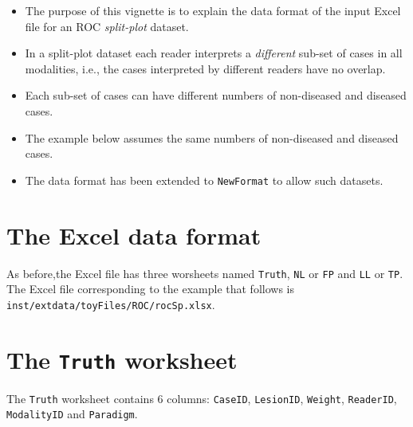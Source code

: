 \documentclass[]{book}
\providecommand{\tightlist}{%
  \setlength{\itemsep}{0pt}\setlength{\parskip}{0pt}}
\begin{document}
\begin{itemize}
\tightlist
\item
  The purpose of this vignette is to explain the data format of the input Excel file for an ROC \emph{split-plot} dataset.
\item
  In a split-plot dataset each reader interprets a \emph{different} sub-set of cases in all modalities, i.e., the cases interpreted by different readers have no overlap.
\item
  Each sub-set of cases can have different numbers of non-diseased and diseased cases.
\item
  The example below assumes the same numbers of non-diseased and diseased cases.
\item
  The data format has been extended to \texttt{NewFormat} to allow such datasets.
\end{itemize}

\hypertarget{the-excel-data-format-2}{%
\section{The Excel data format}\label{the-excel-data-format-2}}

As before,the Excel file has three worsheets named \texttt{Truth}, \texttt{NL} or \texttt{FP} and \texttt{LL} or \texttt{TP}. The Excel file corresponding to the example that follows is \texttt{inst/extdata/toyFiles/ROC/rocSp.xlsx}.

\hypertarget{the-truth-worksheet-2}{%
\section{\texorpdfstring{The \texttt{Truth} worksheet}{The Truth worksheet}}\label{the-truth-worksheet-2}}

The \texttt{Truth} worksheet contains 6 columns: \texttt{CaseID}, \texttt{LesionID}, \texttt{Weight}, \texttt{ReaderID}, \texttt{ModalityID} and \texttt{Paradigm}.
\end{document}
